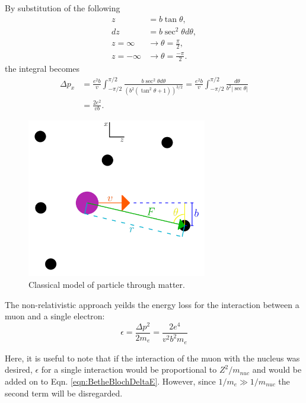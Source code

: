 By substitution of the following
\begin{align*}
z &= b\tan{\theta},\\
dz &= b\sec^2{\theta} d\theta,\\
z=\infty&\rightarrow \theta = \frac{\pi}{2},\\
z=-\infty&\rightarrow \theta = \frac{-\pi}{2}.
\end{align*}
the integral becomes
\begin{align*}
\Delta p_x &=\frac{e^2 b}{v}\int_{-\pi/2} ^{\pi/2} \frac{b\sec^2{\theta} d\theta}{(b^2(\tan^2{\theta}+1))^{3/2}} =\frac{e^2 b}{v}\int_{-\pi/2} ^{\pi/2} \frac{d\theta}{b^2 |\sec{\theta}|}\\
&=\frac{2e^2}{vb}.
\end{align*}

\begin{figure}[h!]
  \centering
    \includegraphics[width=0.7\textwidth]{Figures/bethe_bloch} 
  \caption{Classical model of particle through matter.}
  \label{fig:bethe_bloch}
\end{figure}

The non-relativistic approach yeilds the energy loss for the interaction between a muon and a single electron:
\begin{equation}\label{eqn:BetheBlochDeltaE}
\epsilon=\frac{\Delta p^2}{2m_e}=\frac{2e^4}{v^2 b^2 m_e}
\end{equation}

Here, it is useful to note that if the interaction of the muon with the nucleus was desired, $\epsilon$ for a single interaction would be proportional to $Z^2/m_{nuc}$ and would be added on to Eqn. \ref{eqn:BetheBlochDeltaE}. However, since $1/m_e \gg 1/m_{nuc}$ the second term will be disregarded.

